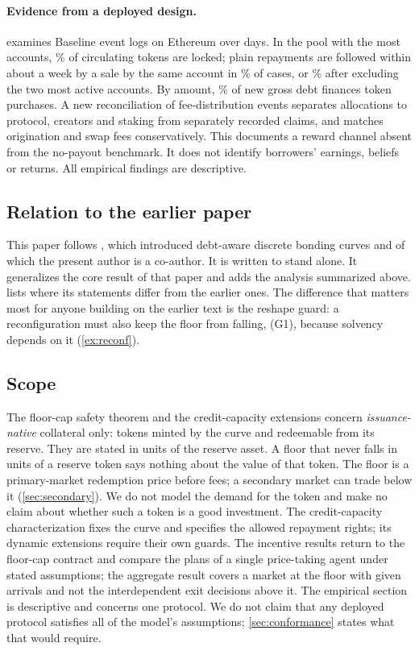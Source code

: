 \paragraph{Evidence from a deployed design.}
 examines \ELogs{} Baseline event logs on Ethereum over \EDays{} days. In the pool with the most accounts, \EBShare\% of circulating tokens are locked; plain repayments are followed within about a week by a sale by the same account in \ERepaySoldPct\% of cases, or \ERestPct\% after excluding the two most active accounts. By amount, \ELeverAmtPct\% of new gross debt finances token purchases. A new reconciliation of fee-distribution events separates allocations to protocol, creators and staking from separately recorded claims, and matches origination and swap fees conservatively. This documents a reward channel absent from the no-payout benchmark. It does not identify borrowers' earnings, beliefs or returns. All empirical findings are descriptive.

\subsection{Relation to the earlier paper}

This paper follows \vone, which introduced debt-aware discrete bonding curves and of which the present author is a co-author. It is written to stand alone. It generalizes the core result of that paper and adds the analysis summarized above.  lists where its statements differ from the earlier ones. The difference that matters most for anyone building on the earlier text is the reshape guard: a reconfiguration must also keep the floor from falling, (G1), because solvency depends on it (\cref{ex:reconf}).

\subsection{Scope}

The floor-cap safety theorem and the credit-capacity extensions concern \emph{issuance-native} collateral only: tokens minted by the curve and redeemable from its reserve. They are stated in units of the reserve asset. A floor that never falls in units of a reserve token says nothing about the value of that token. The floor is a primary-market redemption price before fees; a secondary market can trade below it (\cref{sec:secondary}). We do not model the demand for the token and make no claim about whether such a token is a good investment. The credit-capacity characterization fixes the curve and specifies the allowed repayment rights; its dynamic extensions require their own guards. The incentive results return to the floor-cap contract and compare the plans of a single price-taking agent under stated assumptions; the aggregate result covers a market at the floor with given arrivals and not the interdependent exit decisions above it. The empirical section is descriptive and concerns one protocol. We do not claim that any deployed protocol satisfies all of the model's assumptions; \cref{sec:conformance} states what that would require.
